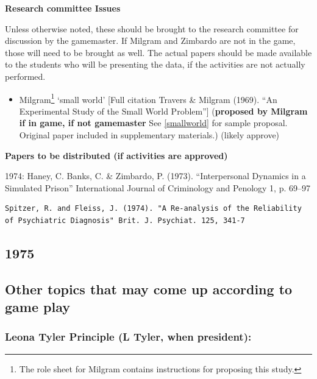 \begin{refsection}
\textbf{Research committee Issues}

Unless otherwise noted, these should be brought to the research committee for discussion by the gamemaster. If Milgram and Zimbardo are not in the game, those will need to be brought as well. The actual papers should be made available to the students who will be presenting the data, if the activities are not actually performed.

\begin{itemize}
\item Milgram\footnote{The role sheet for Milgram contains instructions for proposing this study.} `small world' [Full citation Travers \& Milgram (1969). ``An Experimental Study of the Small World Problem''] (\textbf{proposed by Milgram if in game, if not gamemaster} See \ref{smallworld} for sample proposal. Original paper included in supplementary materials.) (likely approve)

\end{itemize}

\textbf{Papers to be distributed (if activities are approved)}

1974: Haney, C. Banks, C. \& Zimbardo, P. (1973). ``Interpersonal Dynamics in a Simulated Prison'' International Journal of Criminology and Penology 1, p. 69--97 

\begin{verbatim}
Spitzer, R. and Fleiss, J. (1974). "A Re-analysis of the Reliability of Psychiatric Diagnosis" Brit. J. Psychiat. 125, 341-7
\end{verbatim}

\newpage

\subsection{1975}
\label{1975}

\newpage

\subsection{Other topics that may come up according to game play}
\label{othertopicsthatmaycomeupaccordingtogameplay}

\subsubsection{Leona Tyler Principle (L Tyler, when president):}
\label{leonatylerprincipleltylerwhenpresident:}


\end{refsection}
